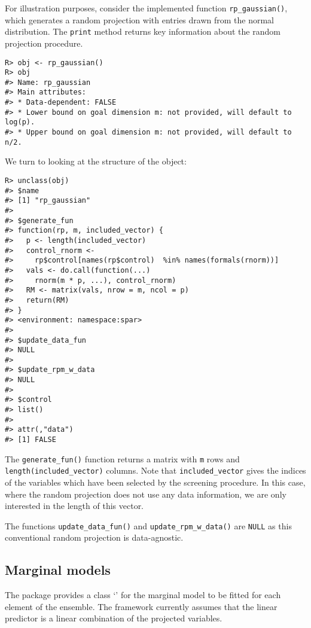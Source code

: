 \documentclass[
  article,
  nojss]{jss}
\newcommand{\class}[1]{`\code{#1}'}
\begin{document}
For illustration purposes, consider the implemented function
\texttt{rp\_gaussian()}, which generates a random projection with
entries drawn from the normal distribution. The \texttt{print} method
returns key information about the random projection procedure.

\begin{verbatim}
R> obj <- rp_gaussian()
R> obj
#> Name: rp_gaussian 
#> Main attributes: 
#> * Data-dependent: FALSE 
#> * Lower bound on goal dimension m: not provided, will default to log(p). 
#> * Upper bound on goal dimension m: not provided, will default to n/2.
\end{verbatim}

We turn to looking at the structure of the object:

\begin{verbatim}
R> unclass(obj)
#> $name
#> [1] "rp_gaussian"
#> 
#> $generate_fun
#> function(rp, m, included_vector) {
#>   p <- length(included_vector)
#>   control_rnorm <-
#>     rp$control[names(rp$control)  %in% names(formals(rnorm))]
#>   vals <- do.call(function(...)
#>     rnorm(m * p, ...), control_rnorm)
#>   RM <- matrix(vals, nrow = m, ncol = p)
#>   return(RM)
#> }
#> <environment: namespace:spar>
#> 
#> $update_data_fun
#> NULL
#> 
#> $update_rpm_w_data
#> NULL
#> 
#> $control
#> list()
#> 
#> attr(,"data")
#> [1] FALSE
\end{verbatim}

The \texttt{generate\_fun()} function returns a matrix with \texttt{m}
rows and \texttt{length(included\_vector)} columns. Note that
\texttt{included\_vector} gives the indices of the variables which have
been selected by the screening procedure. In this case, where the random
projection does not use any data information, we are only interested in
the length of this vector.

The functions \texttt{update\_data\_fun()} and
\texttt{update\_rpm\_w\_data()} are \texttt{NULL} as this conventional
random projection is data-agnostic.

\subsection{Marginal models}\label{marginal-models}

The package provides a class \class{sparmodel} for the marginal model to
be fitted for each element of the ensemble. The framework currently
assumes that the linear predictor is a linear combination of the
projected variables.
\end{document}
